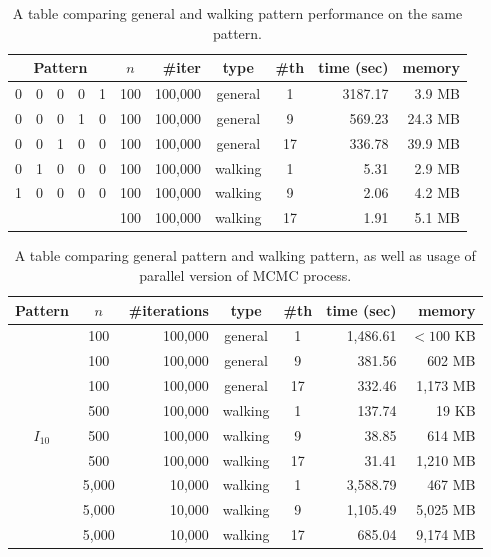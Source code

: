 \begin{table}[]
\centering
\begin{tabular}{|ccccc|c|r|c|c|r|r|}
\hline
\multicolumn{5}{|c|}{\textbf{Pattern}} & \textbf{$n$} & \textbf{\#iter} & \textbf{type} & \textbf{\#th} & \textbf{time (sec)} & \textbf{memory} \\ \hline
0 & 0 & 0 & 0 & 1 & 100 & 100,000 & general & 1 & 3187.17 & 3.9 MB \\ \cline{6-11} 
0 & 0 & 0 & 1 & 0 & 100 & 100,000 & general & 9 & 569.23 & 24.3 MB \\ \cline{6-11} 
0 & 0 & 1 & 0 & 0 & 100 & 100,000 & general & 17 & 336.78 & 39.9 MB \\ \cline{6-11} 
0 & 1 & 0 & 0 & 0 & 100 & 100,000 & walking & 1 & 5.31 & 2.9 MB \\ \cline{6-11} 
1 & 0 & 0 & 0 & 0 & 100 & 100,000 & walking & 9 & 2.06 & 4.2 MB \\ \cline{6-11} 
  &   &   &   &   & 100 & 100,000 & walking & 17 & 1.91 & 5.1 MB \\ \hline
\end{tabular}
\caption{A table comparing general and walking pattern performance on the same pattern.}
\label{measurements2}
\end{table}

\begin{table}[]
\centering
\begin{tabular}{|c|c|r|c|c|r|r|}
\hline
\textbf{Pattern} & \textbf{$n$} & \textbf{\#iterations} & \textbf{type} & \textbf{\#th} & \textbf{time (sec)} & \textbf{memory} \\ \hline
\multirow{9}{*}{$I_{10}$}
 & 100 & 100,000 & general & 1 & 1,486.61 & $<100$ KB \\ \cline{2-7} 
 & 100 & 100,000 & general & 9 & 381.56 & 602 MB \\ \cline{2-7} 
 & 100 & 100,000 & general & 17 & 332.46 & 1,173 MB \\ \cline{2-7} 
 & 500 & 100,000 & walking & 1 & 137.74 & 19 KB \\ \cline{2-7} 
 & 500 & 100,000 & walking & 9 & 38.85 & 614 MB \\ \cline{2-7} 
 & 500 & 100,000 & walking & 17 & 31.41 & 1,210 MB \\ \cline{2-7} 
 & 5,000 & 10,000 & walking & 1 & 3,588.79 & 467 MB \\ \cline{2-7} 
 & 5,000 & 10,000 & walking & 9 & 1,105.49 & 5,025 MB \\ \cline{2-7} 
 & 5,000 & 10,000 & walking & 17 & 685.04 & 9,174 MB \\ \hline
\end{tabular}
\caption{A table comparing general pattern and walking pattern, as well as usage of parallel version of MCMC process.}
\label{measurements3}
\end{table}